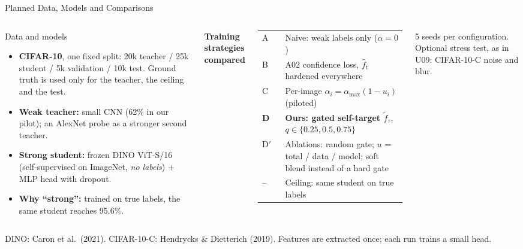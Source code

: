 \documentclass[aspectratio=169,11pt,professionalfonts]{beamer}
\newcommand{\src}[1]{{\scriptsize\color{softGray}#1}}
\newcommand{\fhat}{\hat f_t}
\newcommand{\ftil}{\tilde f_\tau}
\begin{document}
\begin{frame}[t]{Planned Data, Models and Comparisons}
\begin{columns}[T,totalwidth=\textwidth]
\begin{block}{Data and models}
\footnotesize
\begin{itemize}
  \item \textbf{CIFAR-10}, one fixed split: 20k teacher / 25k student / 5k validation / 10k test.
  Ground truth is used only for the teacher, the ceiling and the test.
  \item \textbf{Weak teacher:} small CNN (62\% in our pilot); an AlexNet probe as a stronger second teacher.
  \item \textbf{Strong student:} frozen DINO ViT-S/16 (self-supervised on ImageNet, \emph{no labels}) + MLP head
  with dropout.
  \item \textbf{Why ``strong'':} trained on true labels, the same student reaches 95.6\%.
\end{itemize}
\end{block}
\small\textbf{Training strategies compared}

\vspace{0.2em}
\footnotesize\setlength{\tabcolsep}{3pt}
\begin{tabular}{@{}l>{\raggedright\arraybackslash}p{0.84\linewidth}@{}}
\toprule
A & Naive: weak labels only ($\alpha=0$)\\
B & A02 confidence loss, $\fhat$ hardened everywhere\\
C & Per-image $\alpha_i=\alpha_{\max}(1-u_i)$ \;(piloted)\\
\textbf{D} & \textbf{Ours: gated self-target $\ftil$}, $q\in\{0.25,0.5,0.75\}$\\
D$'$ & Ablations: random gate; $u$ = total / data / model; soft blend instead of a hard gate\\
-- & Ceiling: same student on true labels\\
\bottomrule
\end{tabular}

\vspace{0.4em}
\footnotesize 5 seeds per configuration. Optional stress test, as in U09: CIFAR-10-C noise and blur.
\end{columns}
\vspace{0.3em}
\src{DINO: Caron et al.\ (2021). CIFAR-10-C: Hendrycks \& Dietterich (2019). Features are extracted once; each run trains a small head.}
\end{frame}
\end{document}
